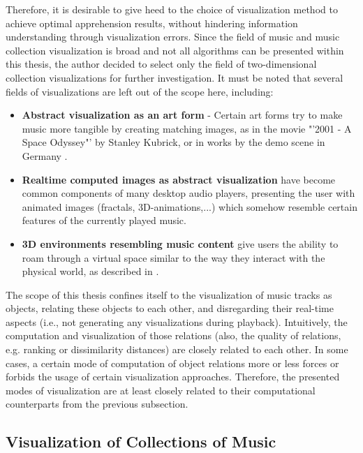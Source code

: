 Therefore, it is desirable to give heed to the choice of visualization method to achieve optimal apprehension results, without hindering information understanding through visualization errors.
Since the field of music and music collection visualization is broad and not all algorithms can be presented within this thesis, the author decided to select only the field of two-dimensional collection visualizations for further investigation. It must be noted that several fields of visualizations are left out of the scope here, including:

\begin{itemize}
	\item \textbf{Abstract visualization as an art form} - Certain art forms try to make music more tangible by creating matching images, as in the movie "'2001 - A Space Odyssey"' by Stanley Kubrick, or in works by the demo scene in Germany \cite{Scheib:2002}.
	\item \textbf{Realtime computed images as abstract visualization} have become common components of many desktop audio players, presenting the user with animated images (fractals, 3D-animations,...) which somehow resemble certain features of the currently played music.
	\item \textbf{3D environments resembling music content} give users the ability to roam through a virtual space similar to the way they interact with the physical world, as described in \cite{Dittenbach:2007}.
\end{itemize}

The scope of this thesis confines itself to the visualization of music tracks as objects, relating these objects to each other, and disregarding their real-time aspects (i.e., not generating any visualizations during playback).
Intuitively, the computation and visualization of those relations (also, the quality of relations, e.g. ranking or dissimilarity distances) are closely related to each other. In some cases, a certain mode of computation of object relations more or less forces or forbids the usage of certain visualization approaches. Therefore, the presented modes of visualization are at least closely related to their computational counterparts from the previous subsection.

\subsection{Visualization of Collections of Music}


